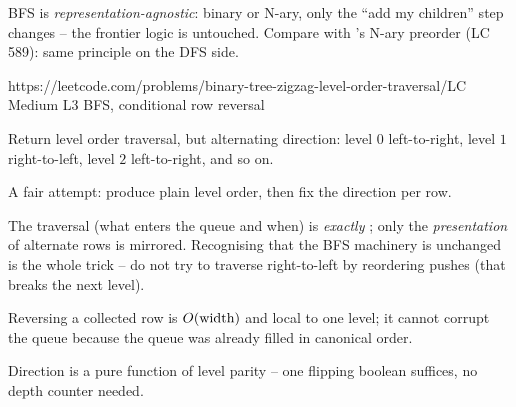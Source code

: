 
\begin{insightbox}
BFS is \emph{representation-agnostic}: binary or N-ary, only the ``add my children'' step
changes -- the frontier logic is untouched. Compare with 's N-ary
preorder (LC 589): same principle on the DFS side.
\end{insightbox}

  {https://leetcode.com/problems/binary-tree-zigzag-level-order-traversal/}{LC Medium L3}
  {BFS, conditional row reversal}

\begin{problemstatement}
Return level order traversal, but alternating direction: level $0$ left-to-right, level
$1$ right-to-left, level $2$ left-to-right, and so on.
\end{problemstatement}

\begin{attemptgate}
A fair attempt: produce plain level order, then fix the direction per row.
\end{attemptgate}

The traversal (what enters the queue and when) is \emph{exactly} ; only
the \emph{presentation} of alternate rows is mirrored. Recognising that the BFS machinery
is unchanged is the whole trick -- do not try to traverse right-to-left by reordering
pushes (that breaks the next level).

\begin{observation}
Reversing a collected row is $O(\text{width})$ and local to one level; it cannot
corrupt the queue because the queue was already filled in canonical order.
\end{observation}
\begin{observation}
Direction is a pure function of level parity -- one flipping boolean suffices, no depth
counter needed.
\end{observation}

